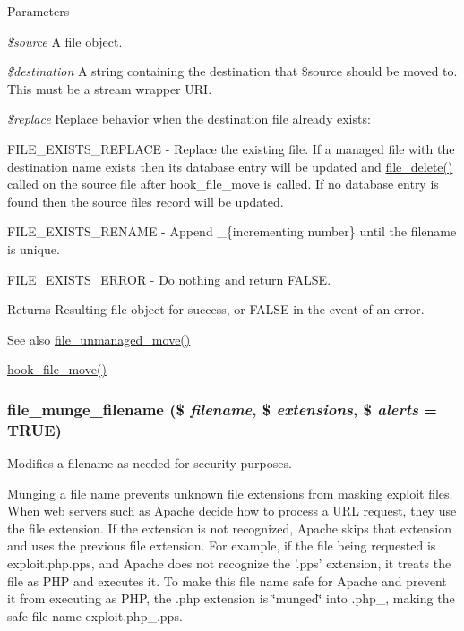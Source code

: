 \begin{DoxyParams}{Parameters}
\item[{\em \$source}]A file object. \item[{\em \$destination}]A string containing the destination that \$source should be moved to. This must be a stream wrapper URI. \item[{\em \$replace}]Replace behavior when the destination file already exists:
\begin{DoxyItemize}
\item FILE\_\-EXISTS\_\-REPLACE -\/ Replace the existing file. If a managed file with the destination name exists then its database entry will be updated and \hyperlink{group__file_gac7503f0dcdea965d68e4a242e7760921}{file\_\-delete()} called on the source file after hook\_\-file\_\-move is called. If no database entry is found then the source files record will be updated.
\item FILE\_\-EXISTS\_\-RENAME -\/ Append \_\-\{incrementing number\} until the filename is unique.
\item FILE\_\-EXISTS\_\-ERROR -\/ Do nothing and return FALSE.
\end{DoxyItemize}\end{DoxyParams}
\begin{DoxyReturn}{Returns}
Resulting file object for success, or FALSE in the event of an error.
\end{DoxyReturn}
\begin{DoxySeeAlso}{See also}
\hyperlink{group__file_ga3fd3a919ca321ec8c5bd1e4b069237a1}{file\_\-unmanaged\_\-move()} 

\hyperlink{group__hooks_ga7053514a7a923b43960b31cacfa9ce95}{hook\_\-file\_\-move()} 
\end{DoxySeeAlso}
\hypertarget{group__file_gae5f97959982c78dfde2f806757c21368}{
\subsubsection[{file\_\-munge\_\-filename}]{\setlength{\rightskip}{0pt plus 5cm}file\_\-munge\_\-filename (\$ {\em filename}, \/  \$ {\em extensions}, \/  \$ {\em alerts} = {\ttfamily TRUE})}}
\label{group__file_gae5f97959982c78dfde2f806757c21368}
Modifies a filename as needed for security purposes.

Munging a file name prevents unknown file extensions from masking exploit files. When web servers such as Apache decide how to process a URL request, they use the file extension. If the extension is not recognized, Apache skips that extension and uses the previous file extension. For example, if the file being requested is exploit.php.pps, and Apache does not recognize the '.pps' extension, it treats the file as PHP and executes it. To make this file name safe for Apache and prevent it from executing as PHP, the .php extension is \char`\"{}munged\char`\"{} into .php\_\-, making the safe file name exploit.php\_\-.pps.

